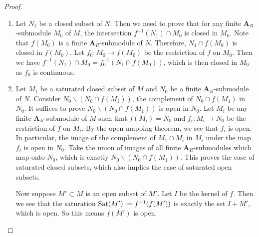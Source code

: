 \documentclass[10pt]{article}
\numberwithin{equation}{section}
\newcommand{\bfA}{{\textbf{A}}}
\begin{document}
\begin{proof}
\begin{enumerate}
    \item Let $N_1$ be a closed subset of $N$. Then we need to prove that for any finite $\bfA_R$-submodule $M_0$ of $M$, the intersection $f^{-1}(N_1)\cap M_0$ is closed in $M_0$. Note that $f(M_0)$ is a finite $\bfA_R$-submodule of $N$. Therefore, $N_1\cap f(M_0)$ is closed in $f(M_0)$. Let $f_0:M_0\to f(M_0)$ be the restriction of $f$ on $M_0$. Then we have $f^{-1}(N_1)\cap M_0=f_0^{-1}(N_1\cap f(M_0))$, which is then closed in $M_0$ as $f_0$ is continuous.
    
    \item Let $M_1$ be a saturated closed subset of $M$ and $N_0$ be a finite $\bfA_R$-submodule of $N$. Consider $N_0\backslash (N_0\cap f(M_1))$, the complement of $N_0\cap f(M_1)$ in $N_0$. It suffices to prove $N_0\backslash (N_0\cap f(M_1))$ is open in $N_0$. Let $M_i$ be any finite $\bfA_R$-submodule of $M$ such that $f(M_i)=N_0$ and $f_i:M_i\to N_0$ be the restriction of $f$ on $M_i$. By the open mapping theorem, we see that $f_i$ is open. In particular, the image of the complement of $M_1\cap M_i$ in $M_i$ under the map $f_i$ is open in $N_0$. Take the union of images of all finite $\bfA_R$-submodules which map onto $N_0$, which is exactly $N_0\backslash (N_0\cap f(M_1))$. This proves the case of saturated closed subsets, which also implies the case of saturated open subsets. 
    
      Now suppose $M'\subset M$ is an open subset of $M'$. Let $I$ be the kernel of $f$. Then we see that the saturation ${\rm Sat}(M'):=f^{-1}(f(M'))$ is exactly the set $I+M'$, which is open. So this means $f(M')$ is open.
\end{enumerate}
     
\end{proof}
\end{document}
